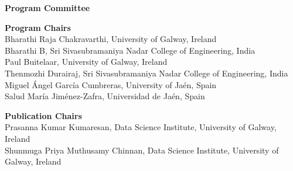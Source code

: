 \documentclass[11pt,oneside]{book}
\begin{document}

{}
\begin{center}
\Large \textbf{Program Committee}
\end{center}
\vspace*{1cm}
\begin{description}
  \item{\bf Program Chairs}\vspace{2mm}\\
            Bharathi Raja Chakravarthi, University of Galway, Ireland\\
          Bharathi B, Sri Sivasubramaniya Nadar College of Engineering, India\\
          Paul Buitelaar, University of Galway, Ireland\\
          Thenmozhi Durairaj, Sri Sivasubramaniya Nadar College of Engineering, India\\
          Miguel Ángel García Cumbreras, University of Jaén, Spain\\
          Salud María Jiménez-Zafra, Universidad de Jaén, Spain\\
      
  \item{\bf Publication Chairs}\vspace{2mm}\\
            Prasanna Kumar Kumaresan, Data Science Institute, University of Galway, Ireland\\
          Shunmuga Priya Muthusamy Chinnan, Data Science Institute, University of Galway, Ireland\\
      

\end{description}
\end{document}

